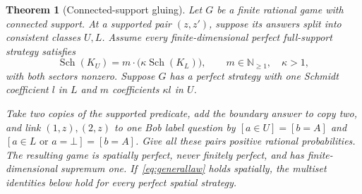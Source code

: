 \documentclass[11pt]{article}
\newtheorem{theorem}{Theorem}[section]
\theoremstyle{definition}
\DeclareMathOperator{\Sch}{Sch}
\newcommand{\mult}[2]{#1\mathbin{\cdot}#2}
\begin{document}
\begin{theorem}[Connected-support gluing]\label{thm:gluing}
Let $G$ be a finite rational game with connected support. At a supported pair $(z,z')$, suppose its answers split into consistent classes $U,L$. Assume every finite-dimensional perfect full-support strategy satisfies
\begin{equation}\label{eq:generallaw}
\Sch(K_U)=\mult{m}{\bigl(\kappa\Sch(K_L)\bigr)},\qquad m\in\mathbb N_{\geq1},\quad\kappa>1,
\end{equation}
with both sectors nonzero. Suppose $G$ has a perfect strategy with one Schmidt coefficient $l$ in $L$ and $m$ coefficients $\kappa l$ in $U$.

Take two copies of the supported predicate, add the boundary answer to copy two, and link $(1,z),(2,z)$ to one Bob label question by $[a\in U]=[b=A]$ and $[a\in L\text{ or }a=\bot]=[b=A]$. Give all these pairs positive rational probabilities. The resulting game is spatially perfect, never finitely perfect, and has finite-dimensional supremum one. If~\eqref{eq:generallaw} holds spatially, the multiset identities below hold for every perfect spatial strategy.
\end{theorem}
\end{document}
